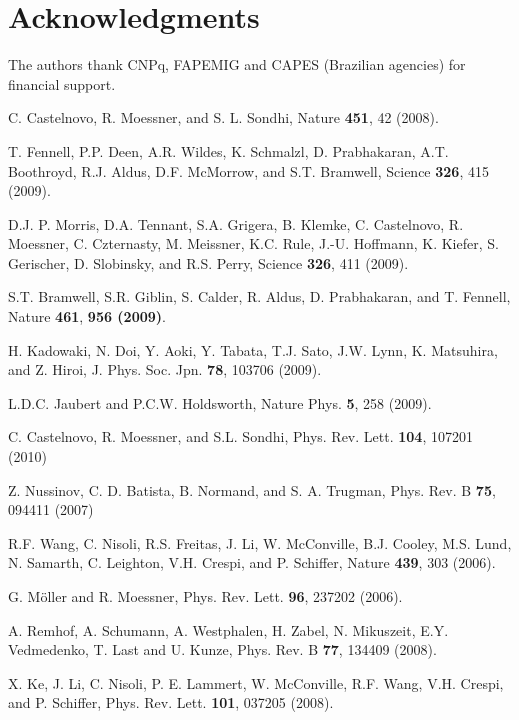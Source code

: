 \documentclass[aps,prb,twocolumn,floatfix,showpacs,amsmath,amssymb]{revtex4}
\begin{document}
\section*{Acknowledgments}

The authors thank CNPq, FAPEMIG and CAPES (Brazilian agencies) for
financial support.

\begin{thebibliography}{2dspins}

 C. Castelnovo, R. Moessner, and  S. L. Sondhi, Nature
\textbf{451}, 42 (2008).

 T. Fennell, P.P. Deen, A.R. Wildes, K. Schmalzl, D. Prabhakaran, A.T. Boothroyd,
R.J. Aldus, D.F. McMorrow, and S.T. Bramwell, Science
\textbf{326}, 415 (2009).

 D.J. P. Morris, D.A. Tennant, S.A. Grigera, B.
Klemke, C. Castelnovo, R. Moessner, C. Czternasty, M. Meissner,
K.C. Rule, J.-U. Hoffmann, K. Kiefer, S. Gerischer, D. Slobinsky,
and R.S. Perry, Science \textbf{326}, 411 (2009).

 S.T. Bramwell, S.R. Giblin, S. Calder, R.
Aldus, D. Prabhakaran, and T. Fennell, Nature \textbf{461},
\textbf{956 (2009)}.

 H. Kadowaki, N. Doi, Y. Aoki, Y. Tabata,
T.J. Sato, J.W. Lynn, K. Matsuhira, and Z. Hiroi, J. Phys. Soc. Jpn.
\textbf{78}, 103706 (2009).

 L.D.C. Jaubert and P.C.W. Holdsworth, Nature Phys.
\textbf{5}, 258 (2009).

C. Castelnovo, R. Moessner, and S.L. Sondhi,
Phys. Rev. Lett. \textbf{104}, 107201 (2010)

 Z. Nussinov, C. D. Batista, B. Normand, and S. A. Trugman, Phys. Rev. B
\textbf{75}, 094411 (2007)

 R.F. Wang, C. Nisoli, R.S. Freitas, J. Li, W. McConville, B.J. Cooley,
M.S. Lund, N. Samarth, C. Leighton, V.H. Crespi, and P. Schiffer,
Nature \textbf{439}, 303 (2006).

 G. M\"{o}ller and R. Moessner, Phys. Rev. Lett.
\textbf{96}, 237202 (2006).

 A. Remhof, A. Schumann, A. Westphalen, H. Zabel,
N. Mikuszeit, E.Y. Vedmedenko, T. Last and U. Kunze, Phys. Rev. B
\textbf{77}, 134409 (2008).

 X. Ke, J. Li, C. Nisoli, P. E. Lammert, W.
McConville, R.F. Wang, V.H. Crespi, and P. Schiffer, Phys. Rev.
Lett. \textbf{101}, 037205 (2008).


\end{thebibliography}
\end{document}
